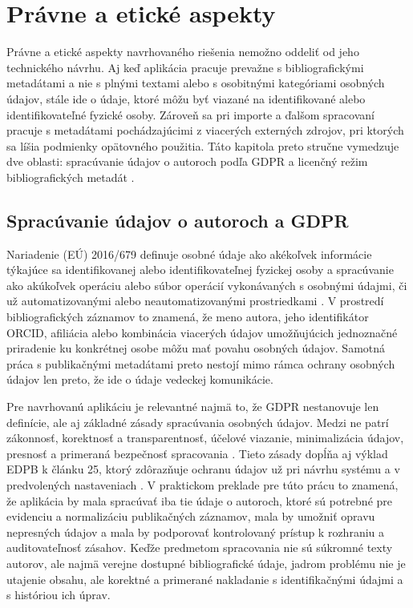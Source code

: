 

\section{Právne a etické aspekty}

Právne a etické aspekty navrhovaného riešenia nemožno oddeliť od jeho technického návrhu. Aj keď aplikácia pracuje prevažne s bibliografickými metadátami a nie s plnými textami alebo s osobitnými kategóriami osobných údajov, stále ide o údaje, ktoré môžu byť viazané na identifikované alebo identifikovateľné fyzické osoby. Zároveň sa pri importe a ďalšom spracovaní pracuje s metadátami pochádzajúcimi z viacerých externých zdrojov, pri ktorých sa líšia podmienky opätovného použitia. Táto kapitola preto stručne vymedzuje dve oblasti: spracúvanie údajov o autoroch podľa GDPR a licenčný režim bibliografických metadát \cite{GDPR2016,CrossrefMetadataRetrieval}.

\subsection{Spracúvanie údajov o autoroch a GDPR}

Nariadenie (EÚ) 2016/679 definuje osobné údaje ako akékoľvek informácie týkajúce sa identifikovanej alebo identifikovateľnej fyzickej osoby a spracúvanie ako akúkoľvek operáciu alebo súbor operácií vykonávaných s osobnými údajmi, či už automatizovanými alebo neautomatizovanými prostriedkami \cite{GDPR2016}. V prostredí bibliografických záznamov to znamená, že meno autora, jeho identifikátor ORCID, afiliácia alebo kombinácia viacerých údajov umožňujúcich jednoznačné priradenie ku konkrétnej osobe môžu mať povahu osobných údajov. Samotná práca s publikačnými metadátami preto nestojí mimo rámca ochrany osobných údajov len preto, že ide o údaje vedeckej komunikácie.

Pre navrhovanú aplikáciu je relevantné najmä to, že GDPR nestanovuje len definície, ale aj základné zásady spracúvania osobných údajov. Medzi ne patrí zákonnosť, korektnosť a transparentnosť, účelové viazanie, minimalizácia údajov, presnosť a primeraná bezpečnosť spracovania \cite{GDPR2016}. Tieto zásady dopĺňa aj výklad EDPB k článku 25, ktorý zdôrazňuje ochranu údajov už pri návrhu systému a v predvolených nastaveniach \cite{EDPBGuidelinesDPbDD2019}. V praktickom preklade pre túto prácu to znamená, že aplikácia by mala spracúvať iba tie údaje o autoroch, ktoré sú potrebné pre evidenciu a normalizáciu publikačných záznamov, mala by umožniť opravu nepresných údajov a mala by podporovať kontrolovaný prístup k rozhraniu a auditovateľnosť zásahov. Keďže predmetom spracovania nie sú súkromné texty autorov, ale najmä verejne dostupné bibliografické údaje, jadrom problému nie je utajenie obsahu, ale korektné a primerané nakladanie s identifikačnými údajmi a s históriou ich úprav.

